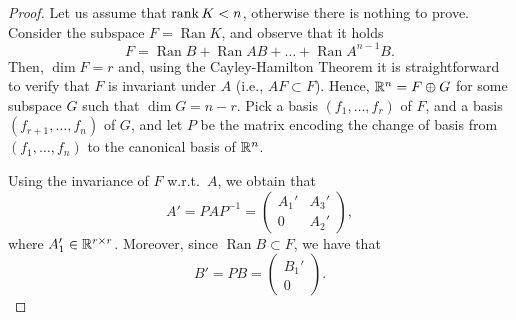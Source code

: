 \begin{proof}
    Let us assume that $\operatorname{rank} K < n$, otherwise there is nothing to prove.
    Consider the subspace $F=\operatorname{Ran} K$, and observe that it holds 
    \begin{equation}
        F =\operatorname{Ran} B + \operatorname{Ran} AB + \ldots +\operatorname{Ran} A^{n-1}B.
    \end{equation}
    Then, $\dim F=r$ and, using the Cayley-Hamilton Theorem it is straightforward to verify that $F$ is invariant under $A$ (i.e., $AF\subset F$).
    Hence, $\mathbb{R}^n = F\oplus G$ for some subspace $G$ such that $\dim G=n-r$.
    Pick   a basis $(f_1,\ldots, f_r)$ of $F$, and a basis $(f_{r+1},\ldots, f_n)$ of $G$, and let $P$ be the matrix encoding the change of basis from $(f_1,\ldots, f_n)$ to the canonical basis of $\mathbb{R}^n$.

    Using the invariance of $F$ w.r.t.~$A$, we obtain that 
    \begin{equation}
        A' = PAP^{-1} =
        \begin{pmatrix}
            A_1' & A_3' \\ 
            0 & A_2'
        \end{pmatrix},
    \end{equation}
    where $A_1'\in \mathbb{R}^{r\times r}$. Moreover, since $\operatorname{Ran} B \subset F$, we have that 
    \begin{equation}
        B' = P B = 
        \begin{pmatrix}
            B_1'\\0
        \end{pmatrix}.
    \end{equation}
\end{proof}



